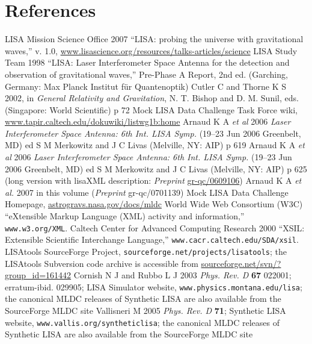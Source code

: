 \documentclass{iopart}
\begin{document}
\section*{References}
\begin{thebibliography}{10}
 LISA Mission Science Office 2007 ``LISA: probing the universe with gravitational waves,'' v. 1.0, \url{www.lisascience.org/resources/talks-articles/science}
 LISA Study Team 1998 ``LISA: Laser Interferometer Space Antenna for the detection and observation of gravitational waves,'' Pre-Phase A Report, 2nd ed. (Garching, Germany: Max Planck Institut f\"ur Quantenoptik)
 Cutler C and Thorne K S 2002, in \emph{General Relativity and Gravitation}, N. T. Bishop and D. M. Sunil, eds. (Singapore: World Scientific) p 72
 Mock LISA Data Challenge Task Force wiki, \url{www.tapir.caltech.edu/dokuwiki/listwg1b:home}
 Arnaud K A \textit{et al} 2006 \textit{Laser Interferometer Space Antenna: 6th Int. LISA Symp.} (19--23 Jun 2006 Greenbelt, MD) ed S M Merkowitz and J C Livas (Melville, NY: AIP) p 619
 Arnaud K A \textit{et al} 2006 \textit{Laser Interferometer Space Antenna: 6th Int. LISA Symp.} (19--23 Jun 2006 Greenbelt, MD) ed S M Merkowitz and J C Livas (Melville, NY: AIP) p 625 (long version with lisaXML description: \textit{Preprint} \url{gr-qc/0609106})
 Arnaud K A {\it et al.} 2007 in this volume (\textit{Preprint} gr-qc/0701139)
%
 Mock LISA Data Challenge Homepage, \url{astrogravs.nasa.gov/docs/mldc}
 World Wide Web Consortium (W3C) ``eXtensible Markup Language (XML) activity and information,'' \texttt{www.w3.org/XML}.
 Caltech Center for Advanced Computing Research 2000 ``XSIL: Extensible Scientific Interchange Language,'' \texttt{www.cacr.caltech.edu/SDA/xsil}.
 LISAtools SourceForge Project, \texttt{sourceforge.net/projects/lisatools}; the LISAtools Subversion code archive is accessible from \url{sourceforge.net/svn/?group_id=161442}
 Cornish N J and Rubbo L J 2003 \emph{Phys. Rev. D} \textbf{67} 022001; erratum-ibid. 029905; LISA Simulator website, \texttt{www.physics.montana.edu/lisa}; the canonical MLDC releases of Synthetic LISA are also available from the SourceForge MLDC site \cite{lisatools}
 Vallisneri M 2005 \emph{Phys. Rev. D} \textbf{71}; Synthetic LISA website, \texttt{www.vallis.org/syntheticlisa}; the canonical MLDC releases of Synthetic LISA are also available from the SourceForge MLDC site \cite{lisatools}

\end{thebibliography}
\end{document}
